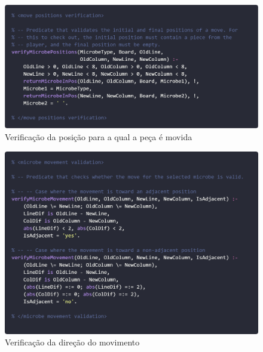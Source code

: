 \documentclass[a4paper]{article}
\begin{document}
\begin{figure}[hbp!]
    \centering
    \includegraphics[width=.66\linewidth]{prints/move-position-verification.png}
    \caption{Verificação da posição para a qual a peça é movida}
    \label{fig}
\end{figure}

\begin{figure}[hbp!]
    \centering
    \includegraphics[width=.66\linewidth]{prints/move-movement-verification.png}
    \caption{Verificação da direção do movimento}
    \label{fig}
\end{figure}
\end{document}

